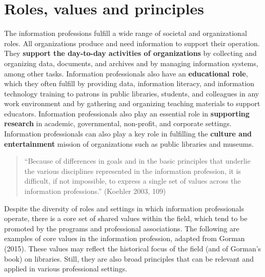 \documentclass[
  letterpaper,
  DIV=11,
  numbers=noendperiod]{scrreprt}
\begin{document}
\section{Roles, values and
principles}\label{roles-values-and-principles}

The information professions fulfill a wide range of societal and
organizational roles. All organizations produce and need information to
support their operation. They \textbf{support the day-to-day activities
of organizations} by collecting and organizing data, documents, and
archives and by managing information systems, among other tasks.
Information professionals also have an \textbf{educational role}, which
they often fulfill by providing data, information literacy, and
information technology training to patrons in public libraries,
students, and colleagues in any work environment and by gathering and
organizing teaching materials to support educators. Information
professionals also play an essential role in \textbf{supporting
research} in academic, governmental, non-profit, and corporate settings.
Information professionals can also play a key role in fulfilling the
\textbf{culture and entertainment} mission of organizations such as
public libraries and museums.

\begin{quote}
``Because of differences in goals and in the basic principles that
underlie the various disciplines represented in the information
profession, it is difficult, if not impossible, to express a single set
of values across the information professions.'' (Koehler 2003, 109)
\end{quote}

Despite the diversity of roles and settings in which information
professionals operate, there is a core set of shared values within the
field, which tend to be promoted by the programs and professional
associations. The following are examples of core values in the
information profession, adapted from Gorman (2015). These values may
reflect the historical focus of the field (and of Gorman's book) on
libraries. Still, they are also broad principles that can be relevant
and applied in various professional settings.
\end{document}
